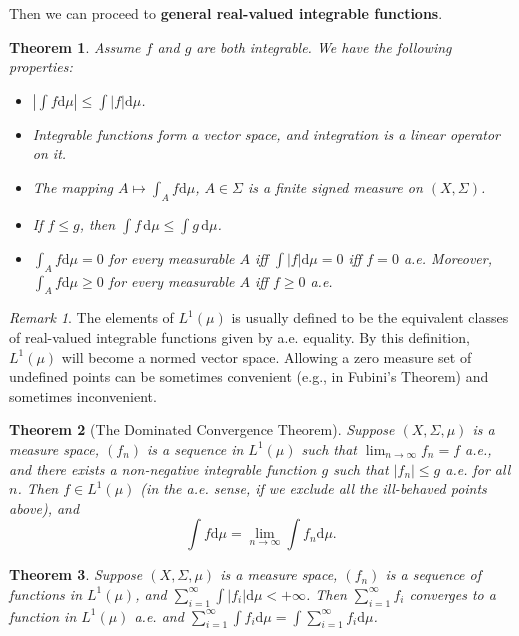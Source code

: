 \documentclass[openany]{book}
\newtheorem{theorem}{Theorem}[chapter]
\theoremstyle{definition}
\theoremstyle{remark}
\newtheorem*{remark}{Remark}
\begin{document}
Then we can proceed to \textbf{general real-valued integrable functions}.
\begin{theorem}
    Assume $f$ and $g$ are both integrable. We have the following properties:
    \begin{itemize}
        \item $\left|\int f\mathrm{d}\mu\right|\le\int|f|\mathrm{d}\mu$.
        \item Integrable functions form a vector space, and integration is a linear operator on it.
        \item The mapping $A\mapsto\int_Af \mathrm{d}\mu$, $A\in\Sigma$ is a finite signed measure on $(X,\Sigma)$.
        \item If $f\le g$, then $\int f\,\mathrm{d}\mu\le\int g\,\mathrm{d}\mu$.
        \item $\int_A f \mathrm{d}\mu=0$ for every measurable $A$ iff $\int|f|\mathrm{d}\mu=0$ iff $f=0$ a.e. Moreover, $\int_A f \mathrm{d}\mu\ge0$ for every measurable $A$ iff $f\ge0$ a.e.
    \end{itemize}
\end{theorem}
\begin{remark}
    The elements of $L^1(\mu)$ is usually defined to be the equivalent classes of real-valued integrable functions given by a.e. equality. By this definition, $L^1(\mu)$ will become a normed vector space. Allowing a zero measure set of undefined points can be sometimes convenient (e.g., in Fubini's Theorem) and sometimes inconvenient.
\end{remark}
\begin{theorem}[The Dominated Convergence Theorem]
    Suppose $(X,\Sigma,\mu)$ is a measure space, $(f_n)$ is a sequence in $L^1(\mu)$ such that $\lim_{n\to\infty}f_n=f$ a.e., and there exists a non-negative integrable function $g$ such that $|f_n|\le g$ a.e. for all $n$. Then $f\in L^1(\mu)$ (in the a.e. sense, if we exclude all the ill-behaved points above), and
    \begin{equation*}
        \int f \mathrm{d}\mu=\lim_{n\to\infty}\int f_n \mathrm{d}\mu.
    \end{equation*}
\end{theorem}
\begin{theorem}\label{thm:L1Banach}
    Suppose $(X,\Sigma,\mu)$ is a measure space, $(f_n)$ is a sequence of functions in $L^1(\mu)$, and $\sum_{i=1}^{\infty}\int|f_i|\mathrm{d}\mu<+\infty$. Then $\sum_{i=1}^{\infty}f_i$ converges to a function in $L^1(\mu)$ a.e. and $\sum_{i=1}^{\infty}\int f_i \mathrm{d}\mu=\int \sum_{i=1}^{\infty}f_i \mathrm{d}\mu$.
\end{theorem}
\end{document}
